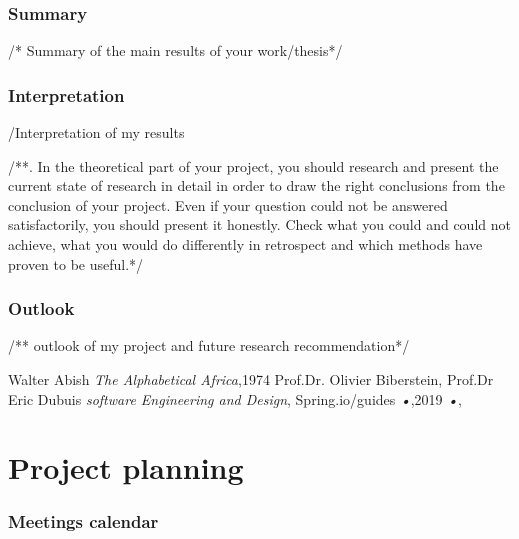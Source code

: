 \documentclass{scrartcl}
\begin{document}
\subsubsection{Summary}
/* Summary of the main results of your work/thesis*/

\subsubsection{Interpretation }
/Interpretation of my results

/**. In the theoretical part of your project, you should research and present the current state of research in detail in order to draw the right conclusions from the conclusion of your project. Even if your question could not be answered satisfactorily, you should present it honestly. Check what you could and could not achieve, what you would do differently in retrospect and which methods have proven to be useful.*/

\subsubsection{Outlook}
/** outlook of my project and future research recommendation*/






\printbibliography[heading=bibintoc]


\begin{thebibliography}{books}
Walter Abish \emph{The Alphabetical Africa},1974
 Prof.Dr. Olivier Biberstein, Prof.Dr Eric Dubuis \emph{software Engineering and Design},
Spring.io/guides \emph{•},2019
 \emph{•},
\end{thebibliography}


\section{Project planning}
\subsubsection{Meetings calendar}
\end{document}
